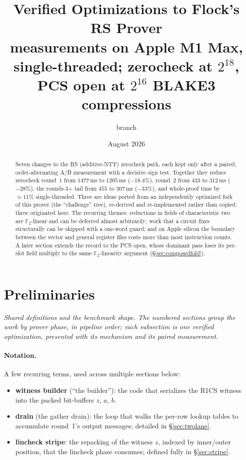 \documentclass[11pt]{article}
\title{Verified Optimizations to Flock's RS Prover\\
{\large measurements on Apple M1 Max, single-threaded; zerocheck at $2^{18}$,
PCS open at $2^{16}$ BLAKE3 compressions}}
\author{branch \code{snark-fast-improvements}}
\date{August 2026}
\newcommand{\Ftwo}{\mathbb{F}_2}
\begin{document}
\maketitle

\begin{abstract}
Seven changes to the RS (additive-NTT) zerocheck path, each kept only after a
paired, order-alternating A/B measurement with a decisive sign test. Together
they reduce zerocheck round~1 from $1477\,$ms to $1205\,$ms ($-18.4\%$),
round~2 from $433$ to $312\,$ms ($-28\%$), the rounds-3+ tail from $455$ to
$307\,$ms ($-33\%$), and whole-proof time by $\approx11\%$
single-threaded. Three are ideas ported
from an independently optimized fork of this prover (the ``challenge'' tree),
re-derived and re-implemented rather than copied; three originated here. The
recurring themes: reductions in fields of characteristic two are
$\Ftwo$-linear and can be deferred almost arbitrarily; work that a circuit
fixes structurally can be skipped with a one-word guard; and on Apple silicon
the boundary between the vector and general register files costs more than
most instruction counts. A later section extends the record to the PCS open,
whose dominant pass loses its per-slot field multiply to the same
$\Ftwo$-linearity argument (\S\ref{sec:composedfold}).
\end{abstract}

\section*{Preliminaries}

\emph{Shared definitions and the benchmark shape. The numbered sections
group the work by prover phase, in pipeline order; each \emph{subsection}
is one verified optimization, presented with its mechanism and its paired
measurement.}

\paragraph{Notation.}
A few recurring terms, used across multiple sections below:
\begin{itemize}
\setlength{\itemsep}{1pt}
\item \textbf{witness builder} (``the builder''): the code that serializes
  the R1CS witness into the packed bit-buffers $z$, $a$, $b$.
\item \textbf{drain} (the gather drain): the loop that walks the per-row
  lookup tables to accumulate round~1's output messages; detailed in
  \S\ref{sec:twolane}.
\item \textbf{lincheck stripe}: the repacking of the witness $z$, indexed
  by inner/outer position, that the lincheck phase consumes; defined
  fully in \S\ref{sec:stripe}.
\end{itemize}
\end{document}
